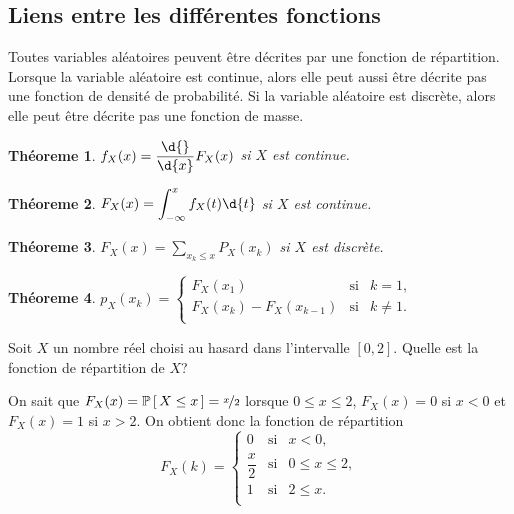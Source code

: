 \documentclass[11pt]{article}
\renewcommand\P[1]{%
	\ensuremath{%
		\mathbb{P}\left[\,#1\,\right]%
	}%
}%
\newtheorem{theoreme}{Théoreme}[section]
\theoremstyle{remark}
\theoremstyle{definition}
\begin{document}
\subsection{Liens entre les différentes fonctions}
Toutes variables aléatoires peuvent être décrites par une fonction de
répartition. Lorsque la variable aléatoire est continue, alors elle peut aussi
être décrite pas une fonction de densité de probabilité. Si la variable
aléatoire est discrète, alors elle peut être décrite pas une fonction de masse.

\begin{theoreme}
	$f_X(x)=\dfrac{\d{}}{\d{x}}F_X(x)$ si $X$ est continue.
\end{theoreme}

\begin{theoreme}
	$F_X(x)=\displaystyle\int_{-\infty}^xf_X(t)\d{t}$ si $X$ est continue.
\end{theoreme}

\begin{theoreme}\label{th:masse_repartition}
	$F_X(x)=\displaystyle\sum_{x_k\leq x}P_X(x_k)$ si $X$ est discrète.
\end{theoreme}

\begin{theoreme}
	$p_X(x_k)=\left\{
		\begin{matrix}
			F_X(x_1)              & \text{si} & k=1,\\
			F_X(x_k)-F_X(x_{k-1}) & \text{si} & k\neq 1.\\
		\end{matrix}
	\right.$
\end{theoreme}

\begin{exemple}
	Soit $X$ un nombre réel choisi au hasard dans l'intervalle $[0,2]$. Quelle
	est la fonction de répartition de $X$?

	On sait que $F_X(x)=\P{X\leq x}=\nicefrac{x}{2}$ lorsque $0\leq x\leq 2$,
	$F_X(x)=0$ si $x<0$ et $F_X(x)=1$ si $x>2$. On obtient donc la fonction de
	répartition
	\begin{equation*}
		F_X(k)=\left\{
			\begin{matrix}
				0            & \text{si} & x<0,\\
				\dfrac{x}{2} & \text{si} & 0\leq x\leq 2,\\
				1            & \text{si} & 2\leq x.\\
			\end{matrix}
		\right.
	\end{equation*}
\end{exemple}
\end{document}
